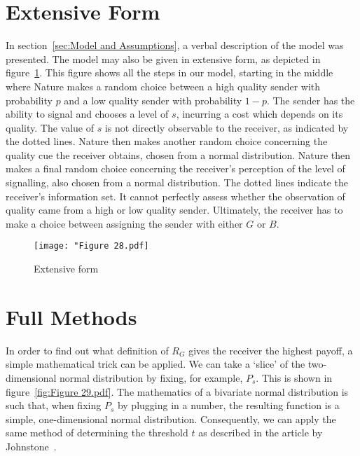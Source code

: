\documentclass[a4paper,12pt]{article}
\numberwithin{equation}{section}
\begin{document}
\newpage


\label{sec:Bibliography}
\renewcommand{\refname}{Bibliography}



\newpage


\appendix

\section{Extensive Form}
\label{sec:Extensive Form}

In section~\ref{sec:Model and Assumptions}, a verbal description of the model was presented. The model may also be given in extensive form, as depicted in figure~\ref{fig:Figure 28.pdf}. This figure shows all the steps in our model, starting in the middle where Nature makes a random choice between a high quality sender with probability $p$ and a low quality sender with probability $1-p$. The sender has the ability to signal and chooses a level of $s$, incurring a cost which depends on its quality. The value of $s$ is not directly observable to the receiver, as indicated by the dotted lines. Nature then makes another random choice concerning the quality cue the receiver obtains, chosen from a normal distribution. Nature then makes a final random choice concerning the receiver's perception of the level of signalling, also chosen from a normal distribution. The dotted lines indicate the receiver's information set. It cannot perfectly assess whether the observation of quality came from a high or low quality sender. Ultimately, the receiver has to make a choice between assigning the sender with either $G$ or $B$.

\begin{figure}[!h]
\begin{center}
\leavevmode
\texttt{[image: "Figure 28.pdf]}
\caption{Extensive form}
\label{fig:Figure 28.pdf}
\end{center}
\end{figure}

\newpage


\section{Full Methods}
\label{sec:Full Methods}

In order to find out what definition of $R_{G}$ gives the receiver the highest payoff, a simple mathematical trick can be applied. We can take a `slice' of the two-dimensional normal distribution by fixing, for example, $P_{s}$. This is shown in figure~\ref{fig:Figure 29.pdf}. The mathematics of a bivariate normal distribution is such that, when fixing $P_{s}$ by plugging in a number, the resulting function is a simple, one-dimensional normal distribution. Consequently, we can apply the same method of determining the threshold $t$ as described in the article by Johnstone~\cite{Johnstone1997}.
\end{document}
